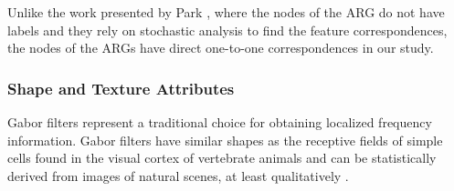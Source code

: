 Unlike the work presented by Park \etal \cite{park_05}, where the
nodes of the ARG do not have labels and they rely on stochastic
analysis to find the feature correspondences, the nodes of the ARGs
have direct one-to-one correspondences in our study.
%
%

\subsubsection{Shape and Texture Attributes}
Gabor filters represent a traditional choice for obtaining localized
frequency information. Gabor filters have similar shapes as the
receptive fields of simple cells found in the visual cortex of
vertebrate animals \cite{Pollen81,Jones87,Devalois88} and can be
statistically derived from images of natural scenes, at least
qualitatively \cite{Olshausen96} \cite{Bell97}.

